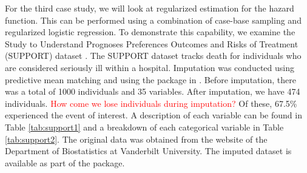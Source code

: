 \documentclass[
]{jss}
\begin{document}
For the third case study, we will look at regularized estimation for the
hazard function. This can be performed using a combination of case-base
sampling and regularized logistic regression. To demonstrate this
capability, we examine the Study to Understand Prognoses Preferences
Outcomes and Risks of Treatment (SUPPORT) dataset
\citep{knaus1995support}. The SUPPORT dataset tracks death for
individuals who are considered seriously ill within a hospital.
Imputation was conducted using predictive mean matching and using the
 package in  \citep{mice}. Before imputation,
there was a total of 1000 individuals and 35 variables. After
imputation, we have 474 individuals.
\textcolor{red}{How come we lose individuals during imputation?} Of
these, 67.5\% experienced the event of interest. A description of each
variable can be found in Table \ref{tab:support1} and a breakdown of
each categorical variable in Table \ref{tab:support2}. The original data
was obtained from the website of the Department of Biostatistics at
Vanderbilt University. The imputed dataset is available as part of the
 package.
\end{document}
